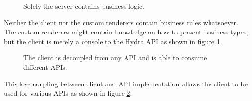 \begin{figure}[!htb]
  \caption{Solely the server contains business logic.}
  \label{fig:businesslogic}
\end{figure}

Neither the client nor the custom renderers contain business rules whatsoever. The custom renderers might contain knowledge on how to present business types, but the client is merely a console to the Hydra API as shown in figure \ref{fig:businesslogic}.

\begin{figure}[!htb]
  \caption{The client is decoupled from any API and is able to consume different APIs.}
  \label{fig:losecoupling}
\end{figure}

This lose coupling between client and API implementation allows the client to be used for various APIs as shown in figure \ref{fig:losecoupling}.

